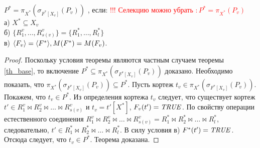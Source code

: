 \author{Мосин Сергей, Зыкин Сергей}
\begin{theorem}
$P^{\ast} = \pi_{X^{\ast}} (\sigma_{F^{\ast}[X_v]} (P_{v}))$
, если: 
\textcolor{red}{!!! Селекцию можно убрать $: P^{\ast} = \pi_{X^{\ast}} (P_{v})$}
\\а) $X^{\ast} \subseteq X_{v}$
\\б) 
$\{R^{v}_{1}, \ldots, R^{v}_{s(v)}\} = \{R^{\ast}_{1}, \ldots, R^{\ast}_{l}\}$
\\в) $\<F_v> = \<F^{\ast}> , M (F^{\ast}) = M (F_{v}) $.
\label{th_base_eq}
\end{theorem} 
\begin{proof}
Поскольку условия теоремы являются частным случаем теоремы \ref{th_base}, то
включение $P^{\ast} \subseteq \pi_{X^{\ast}} (\sigma_{F^{\ast}[X_v]} (P_{v}))$
доказано. Необходимо показать, что
$\pi_{X^{\ast}} (\sigma_{F^{\ast}[X_v]} (P_{v})) \subseteq P^{\ast}$. Пусть
кортеж $t_v \in \pi_{X^{\ast}} (\sigma_{F^{\ast}[X_v]} (P_{v}))$. Покажем, что
$t_v \in P^{\ast}$. Из определения кортежа $t_v$ следует, что существует кортеж  $t' \in R^v_1 \bowtie R^v_2\bowtie\ldots \bowtie R^v_{s(v)}$ и $t_v = t'[X^{\ast}]$, $F_v(t')=\mathit{TRUE}$. По свойству операции естественного соединения $R^v_1 \bowtie R^v_2\bowtie\ldots \bowtie R^v_{s(v)} = R^{\ast}_1 \bowtie R^{\ast}_2\bowtie\ldots \bowtie R^{\ast}_l$, следовательно, $t' \in R^{\ast}_1 \bowtie R^{\ast}_2\bowtie\ldots \bowtie R^{\ast}_l$. В силу условия в) $F^{\ast} (t')=\mathit{TRUE}$. Отсюда следует, что $t_v \in P^{\ast}$. Теорема доказана.
\end{proof}
